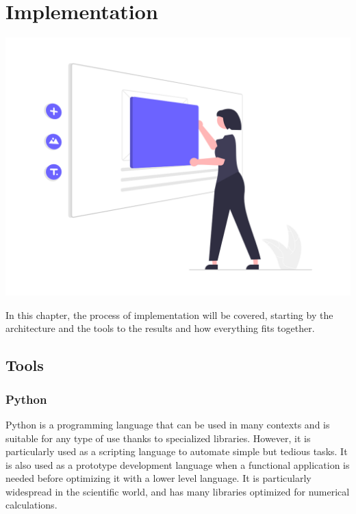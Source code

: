 
\chapter{Implementation}
\renewcommand{\thesection}{\arabic{section}}
		




\label{chapitre5}
		
		\includegraphics [width=1 \linewidth, height=0.8\textheight, keepaspectratio] {images/chaptersFigures/implementation.png}
		
	
		
    \newpage
    \thispagestyle{plain}
In this chapter, the process of implementation will be covered, starting by the architecture and the tools to the results and how everything fits together.

\section{Tools}
\subsection{Python}
Python\cite{WelcomePythonOrg} is a programming language that can be used in many contexts and is suitable for any type of use thanks to specialized libraries. However, it is particularly used as a scripting language to automate simple but tedious tasks. It is also used as a prototype development language when a functional application is needed before optimizing it with a lower level language. It is particularly widespread in the scientific world, and has many libraries optimized for numerical calculations\cite{PythonLangageWikipedia}.
